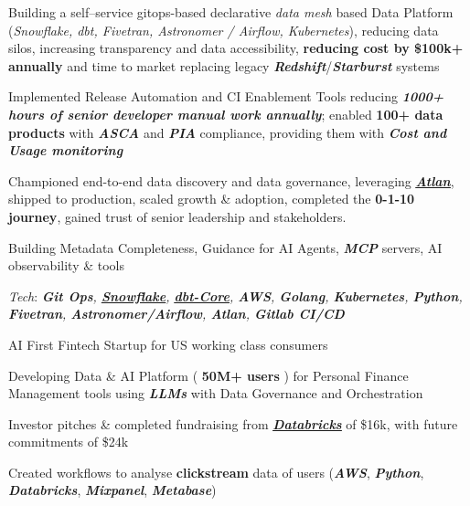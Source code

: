 \documentclass[]{deedy-resume-reversed}
\begin{document}
\vspace{\topsep} %
\begin{tightemize}
\item Building a self–service gitops-based declarative \textit{data mesh}  based Data Platform (\textit{Snowflake, dbt, Fivetran, Astronomer / Airflow, Kubernetes}), reducing data silos, increasing transparency and data accessibility, \textbf{reducing cost by \$100k+ annually} and time to market replacing legacy \textbf{\textit{Redshift}}/\textbf{\textit{Starburst}} systems
\item Implemented Release Automation and CI Enablement Tools reducing \textbf{\textit{1000+ hours of senior developer manual work annually}}; enabled \textbf{{100+ data products}} with \textbf{\textit{ASCA}} and \textbf{\textit{PIA}} compliance, providing them with \textbf{\textit{Cost and Usage monitoring}}
\item Championed end-to-end data discovery and data governance, leveraging \href{https://atlan.com/demo/?ref=%2F&tour=data-discovery}{{\underline{\textbf{\textit{Atlan}}}}}, shipped to production, scaled growth \& adoption, completed the \textbf{0-1-10 journey}, gained trust of senior leadership and stakeholders.
\item Building Metadata Completeness, Guidance for AI Agents, \textbf{\textit{MCP}} servers, AI observability \& tools
\item \textit{Tech}: \textit{\textbf{Git Ops}, \href{https://www.snowflake.com/en/}{\underline{\textbf{Snowflake}}}, \href{https://github.com/arijitroy003/dbt-core}{\underline{\textbf{dbt-Core}}}, \textbf{AWS}, \textbf{Golang}, \textbf{Kubernetes}, \textbf{Python}, \textbf{Fivetran}, \textbf{Astronomer/Airflow}, \textbf{Atlan}, \textbf{Gitlab CI/CD}}
\end{tightemize}
\sectionsep

\vspace{\topsep} %

\begin{tightemize}
\item AI First Fintech Startup for US working class consumers
\item Developing Data \& AI Platform ( \textbf{50M+ users} ) for Personal Finance Management tools using \textbf{\textit{LLMs}} with Data Governance and Orchestration
\item Investor pitches \& completed fundraising from \underline{\href{https://www.databricks.com/product/startups}{\textbf{\textit{Databricks}}}} of \$16k, with future commitments of \$24k
\item Created workflows to analyse \textbf{clickstream} data of users (\textbf{\textit{AWS}}, \textbf{\textit{Python}}, \textbf{\textit{Databricks}}, \textbf{\textit{Mixpanel}}, \textbf{\textit{Metabase}})
\end{tightemize}
\sectionsep
\end{document}
